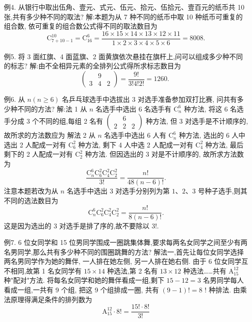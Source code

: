 例4. 从银行中取出伍角、壹元、式元、伍元、拾元、伍拾元、壹百元的纸币共 10 张,共有多少种不同的取法?
解:本题为从 7 种不同的纸币中取 10 种纸币可重复的组合数, 依可重复的组合数公式得不同的取法数目为
$$
\mathrm{C}_{7+10-1}^{10}=\mathrm{C}_{16}^6=\frac{16 \times 15 \times 14 \times 13 \times 12 \times 11}{1 \times 2 \times 3 \times 4 \times 5 \times 6}=8008 .
$$



例5. 将 3 面红旗、4 面蓝旗、2 面黄旗依次悬挂在旗杆上,问可以组成多少种不同的标志?
解:由不全相异元素的全排列公式得所求标志数目为
$$
\left(\begin{array}{lll} 
& 9 & \\
3 & 4 & 2
\end{array}\right)=\frac{9 !}{3 ! 4 ! 2 !}=1260 \text {. }
$$



例6. 从 $n(n \geqslant 6)$ 名乒乓球选手中选拔出 3 对选手准备参加双打比赛, 问共有多少种不同的方法?
解:法 1 从 $n$ 名选手中选出 6 名选手有 $\mathrm{C}_n^6$ 种方法, 将这 6 名选手分成 3 个不同的组,每组 2 名有 $\left(\begin{array}{lll} & 6 & \\ 2 & 2 & 2\end{array}\right)$ 种方法, 但 3 对选手是不计顺序的,故所求的方法数应为
解法 2 从 $n$ 名选手中选出 6 人有 $\mathrm{C}_n^6$ 种方法, 选出的 6 人中选出 2 人配成一对有 $\mathrm{C}_6^2$ 种方法, 剩下 4 人中选 2 人配成一对有 $\mathrm{C}_4^2$ 种方法, 最后剩下的 2 人配成一对有 $\mathrm{C}_2^2$ 种方法.
但因选出的 3 对是不计顺序的, 故所求方法数为
$$
\frac{\mathrm{C}_n^6 \mathrm{C}_6^2 \mathrm{C}_4^2 \mathrm{C}_2^2}{3 !}=\frac{n !}{48(n-6) !} .
$$
注意本题若改为从 $n$ 名选手中选出 3 对选手分别列为第 $1 、 2 、 3$ 号种子选手,则其不同的选法数目为
$$
\mathrm{C}_n^6 \mathrm{C}_6^2 \mathrm{C}_4^2 \mathrm{C}_2^2=\frac{n !}{8(n-6) !} .
$$
这是因为选出的 3 对选手是排了序的,故不要除以 $3 !$.



例7.  6 位女同学和 15 位男同学围成一圈跳集体舞,要求每两名女同学之间至少有两名男同学,那么共有多少种不同的围圈跳舞的方法?
解法一,首先让每位女同学选择两名男同学作为她的舞伴, 一人排在她左侧, 另一人排在她右侧.
由于 6 位女同学互不相同,故第 1 名女同学有 $15 \times 14$ 种选法,第 2 名有 $13 \times 12$ 种选法……共有 $\mathrm{A}_{15}^{12}$ 种"配对"方法.
将每名女同学和她的舞伴看成一组,剩下 $15-12=3$ 名男同学每人看成一组,一共有 9 个组, 把这 9 个组排成一圈, 共有 $(9-1) !=8$ ! 种排法.
由乘法原理得满足条件的排列数为
$$
\mathrm{A}_{15}^{12} \cdot 8 !=\frac{15 ! \cdot 8 !}{3 !}
$$



